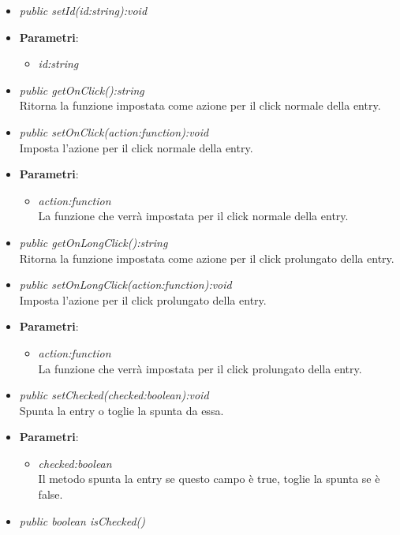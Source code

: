\begin{itemize}
\begin{itemize}
	\item \textit{public setId(id:string):void}\\
	
		\item{\textbf{Parametri}: \begin{itemize}
		\item \textit{id:string}\\
		
		\end{itemize}}
	\item \textit{public getOnClick():string}\\
	Ritorna la funzione impostata come azione per il click normale della entry.
	\item \textit{public setOnClick(action:function):void}\\
	Imposta l'azione per il click normale della entry.
		\item{\textbf{Parametri}: \begin{itemize}
		\item \textit{action:function}\\
		La funzione che verrà impostata per il click normale della entry.
		\end{itemize}}
	\item \textit{public getOnLongClick():string}\\
	Ritorna la funzione impostata come azione per il click prolungato della entry.	
	\item \textit{public setOnLongClick(action:function):void}\\
	Imposta l'azione per il click prolungato della entry.	
		\item{\textbf{Parametri}: \begin{itemize}
		\item \textit{action:function}\\
		La funzione che verrà impostata per il click prolungato della entry.
		\end{itemize}}
	\item \textit{public setChecked(checked:boolean):void}\\
	Spunta la entry o toglie la spunta da essa.
		\item{\textbf{Parametri}: \begin{itemize}
		\item \textit{checked:boolean}\\
		Il metodo spunta la entry se questo campo è true, toglie la spunta se è false.
		\end{itemize}}
	\item \textit{public boolean isChecked()}\\

\end{itemize}
\end{itemize}
